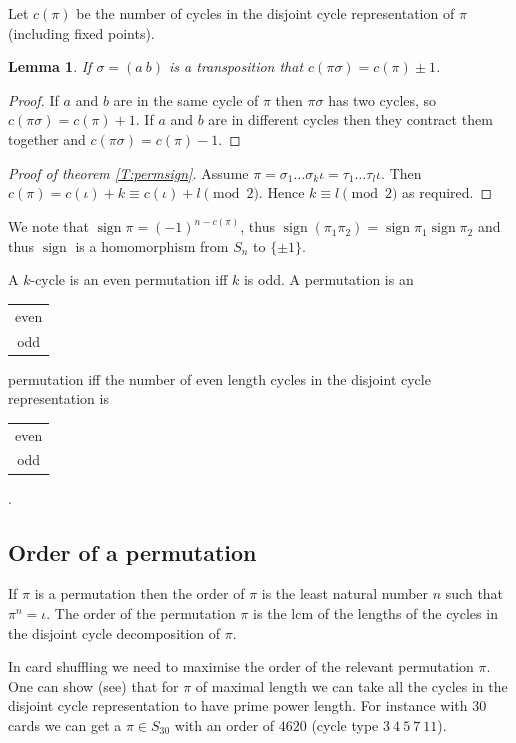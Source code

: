 \documentclass{notes}
\theoremstyle{plain}
\newtheorem{lemma}{Lemma}[chapter]
\DeclareMathOperator{\sign}{sign}
\begin{document}
Let $c(\pi)$ be the number of cycles in the disjoint cycle representation
of $\pi$ (including fixed points).

\begin{lemma}
If $\sigma = (a\ b)$ is a transposition that $c(\pi \sigma) = c(\pi) \pm 1$.
\end{lemma}

\begin{proof}
If $a$ and $b$ are in the same cycle of $\pi$ then $\pi \sigma$ has two
cycles, so $c(\pi \sigma) = c(\pi) + 1$.  If $a$ and $b$ are in different
cycles then they contract them together and $c(\pi \sigma) = c(\pi) - 1$.
\end{proof}

\begin{proof}[Proof of theorem \ref{T:permsign}]
Assume $\pi = \sigma_1 \dots \sigma_k \iota = \tau_1 \dots \tau_l \iota$.  Then
$c(\pi) = c(\iota) + k \equiv c(\iota) + l \pmod{2}$.  Hence $k \equiv
l \pmod{2}$ as required.
\end{proof}

We note that $\sign \pi = (-1)^{n - c(\pi)}$, thus $\sign (\pi_1 \pi_2)
= \sign \pi_1 \sign \pi_2$ and thus $\sign$ is a homomorphism from
$S_n$ to $\{ \pm 1 \}$.

A $k$-cycle is an even permutation iff $k$ is odd.  A permutation is
an \begin{tabular}{c} even \\ odd \end{tabular} permutation iff the number
of even length cycles in the disjoint cycle representation is
\begin{tabular}{c} even \\ odd \end{tabular}.

\subsection{Order of a permutation}

If $\pi$ is a permutation then the order of $\pi$ is the least natural
number $n$ such that $\pi^n = \iota$.  The order of the permutation $\pi$
is the lcm of the lengths of the cycles in the disjoint cycle decomposition
of $\pi$.

In card shuffling we need to maximise the order of the relevant permutation
$\pi$.  One can show (see) that for $\pi$ of maximal length we can take
all the cycles in the disjoint cycle representation to have prime power length.
For instance with $30$ cards we can get a $\pi \in S_{30}$ with an order of
$4620$ (cycle type $3\ 4\ 5\ 7\ 11$).
\end{document}
